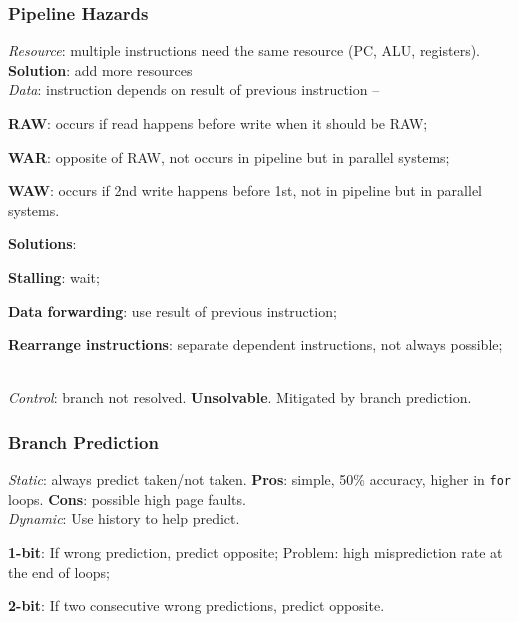 \subsubsection*{Pipeline Hazards}
\emph{Resource}: multiple instructions need the same resource (PC, ALU, registers).
\textbf{Solution}: add more resources\\
\emph{Data}: instruction depends on result of previous instruction -- \begin{enuminline}
    \item \textbf{RAW}: occurs if read happens before write when it should be RAW;
    \item \textbf{WAR}: opposite of RAW, not occurs in pipeline but in parallel systems;
    \item \textbf{WAW}: occurs if 2nd write happens before 1st, not in pipeline but in parallel systems.
\end{enuminline}
\textbf{Solutions}: \begin{enuminline}
    \item \textbf{Stalling}: wait;
    \item \textbf{Data forwarding}: use result of previous instruction;
    \item \textbf{Rearrange instructions}: separate dependent instructions, not always possible;
\end{enuminline}\\
\emph{Control}: branch not resolved. \textbf{Unsolvable}. Mitigated by branch prediction.

\subsubsection*{Branch Prediction}
\emph{Static}: always predict taken/not taken.
\textbf{Pros}: simple, 50\% accuracy, higher in \texttt{for} loops.
\textbf{Cons}: possible high page faults.\\
\emph{Dynamic}: Use history to help predict. \begin{enuminline}
    \item \textbf{1-bit}: If wrong prediction, predict opposite; Problem: high misprediction rate at the end of loops;
    \item \textbf{2-bit}: If two consecutive wrong predictions, predict opposite.
\end{enuminline}

